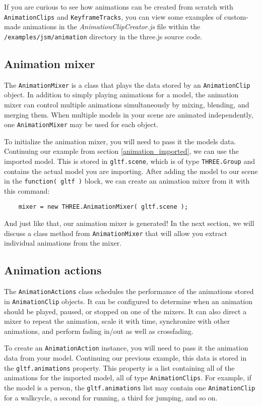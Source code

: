 \documentclass[10pt,final,journal,compsoc]{IEEEtran}
\begin{document}
    If you are curious to see how animations can be created from scratch with \verb|AnimationClips| and \verb|KeyframeTracks|, you can view some examples of custom-made animations in the \textit{AnimationClipCreator.js} file within the \verb|/examples/jsm/animation| directory in the three.js source code.
    
    \subsection{Animation mixer} \label{animation_mixer}
    The \verb|AnimationMixer| is a class that plays the data stored by an \verb|AnimationClip| object. In addition to simply playing animations for a model, the animation mixer can control multiple animations simultaneously by mixing, blending, and merging them. When multiple models in your scene are animated independently, one \verb|AnimationMixer| may be used for each object.
    
    To initialize the animation mixer, you will need to pass it the models data. Continuing our example from section \ref{animation_imported}, we can use the imported model. This is stored in \verb|gltf.scene|, which is of type \verb|THREE.Group| and contains the actual model you are importing. After adding the model to our scene in the \verb|function( gltf )| block, we can create an animation mixer from it with this command:
    
    \begin{lstlisting}
    mixer = new THREE.AnimationMixer( gltf.scene );
    \end{lstlisting}
    
    And just like that, our animation mixer is generated! In the next section, we will discuss a class method from \verb|AnimationMixer| that will allow you extract individual animations from the mixer.
    
    \subsection{Animation actions} \label{animation_actions}
    The \verb|AnimationActions| class schedules the performance of the animations stored in \verb|AnimationClip| objects. It can be configured to determine when an animation should be played, paused, or stopped on one of the mixers. It can also direct a mixer to repeat the animation, scale it with time, synchronize with other animations, and perform fading in/out as well as crossfading.
    
    To create an \verb|AnimationAction| instance, you will need to pass it the animation data from your model. Continuing our previous example, this data is stored in the \verb|gltf.animations| property. This property is a list containing all of the animations for the imported model, all of type \verb|AnimationClips|. For example, if the model is a person, the \verb|gltf.animations| list may contain one \verb|AnimationClip| for a walkcycle, a second for running, a third for jumping, and so on.
    
\end{document}
